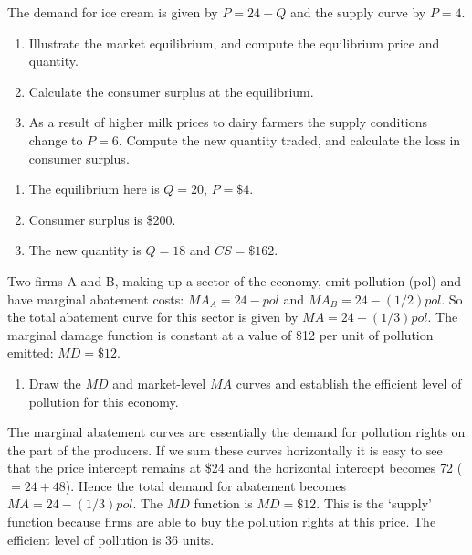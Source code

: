\begin{enumialphparenastyle}
\begin{ex}\label{ex:ch5ex11}
The demand for ice cream is given by $P=24-Q$ and the supply curve by $P=4$.
\begin{enumerate}
	\item	Illustrate the market equilibrium, and compute the equilibrium price and quantity.
	\item	Calculate the consumer surplus at the equilibrium.
	\item	As a result of higher milk prices to dairy farmers the supply conditions change to $P=6$. Compute the new quantity traded, and calculate the loss in consumer surplus.
\end{enumerate}
\begin{sol}
\begin{enumerate}
	\item	The equilibrium here is $Q=20$, $P=\$4$.
	\item	Consumer surplus is \$200.
	\item	The new quantity is $Q=18$ and $CS=\$162$.
\end{enumerate}
\end{sol}
\end{ex}

\begin{ex}\label{ex:ch5ex12}
Two firms A and B, making up a sector of the economy, emit pollution (pol) and have marginal abatement costs: $MA_A=24-pol$ and $MA_B=24-(1/2)pol$. So the total abatement curve for this sector is given by $MA=24-(1/3)pol$. The marginal damage function is constant at a value of \$12 per unit of pollution emitted: $MD=\$12$.
\begin{enumerate}
	\item	Draw the $MD$ and market-level $MA$ curves and establish the efficient level of pollution for this economy.
\end{enumerate}
\begin{sol}
	The marginal abatement curves are essentially the demand for pollution rights on the part of the producers. If we sum these curves horizontally it is easy to see that the price intercept	remains at \$24 and the horizontal intercept becomes 72 ($=24+48$). Hence the total demand for abatement becomes $MA=24-(1/3)pol$. The $MD$ function is $MD=\$12$. This is the `supply' function because firms are	able to buy the pollution rights at this price. The efficient level of pollution is 36 units.
	
\end{sol}
\end{ex}


\end{enumialphparenastyle}
